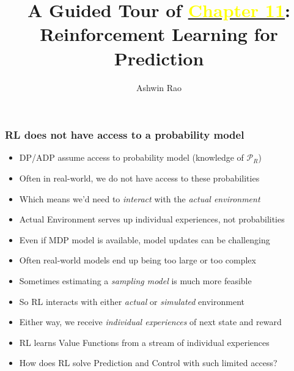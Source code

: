 \documentclass[handout]{beamer}
\title[RL Prediction Chapter]{A Guided Tour of \href{http://stanford.edu/~ashlearn/RLForFinanceBook/book.pdf}{\underline{\textcolor{yellow}{Chapter 11}}}: \\ Reinforcement Learning for Prediction} %
\author{Ashwin Rao} %
\institute[Stanford] %
{ICME, Stanford University
}
\date %
\begin{document}
\lstset{language=Python}  
\begin{frame}
\titlepage %
\end{frame}


\begin{frame}
\frametitle{RL does not have access to a probability model}
\begin{itemize}[<+->]
\item DP/ADP assume access to probability model (knowledge of $\mathcal{P}_R$)
\item Often in real-world, we do not have access to these probabilities
\item Which means we'd need to {\em interact} with the {\em actual environment}
\item {Actual Environment} serves up individual experiences, not probabilities
\item Even if MDP model is available, model updates can be challenging
\item Often real-world models end up being too large or too complex
\item Sometimes estimating a {\em sampling model} is much more feasible
\item So RL interacts with either {\em actual} or {\em simulated} environment
\item Either way, we receive {\em individual experiences} of next state and reward
\item RL learns Value Functions from a stream of individual experiences
\item How does RL solve Prediction and Control with such limited access?
 \end{itemize}
\end{frame}
\end{document}
